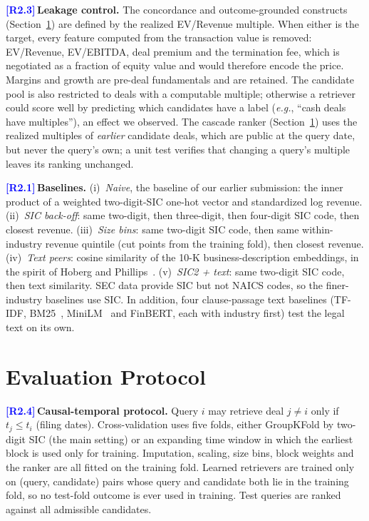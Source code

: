 \documentclass[conference]{IEEEtran}
\newcommand{\eg}{\textit{e.g.}}
\newcommand{\rc}[1]{\textcolor{blue}{\textbf{[#1]}}\,}
\newcommand{\rc}[1]{}
\begin{document}
\rc{R2.3}\noindent\textbf{Leakage control.}
The concordance and outcome-grounded constructs (Section~\ref{sec:eval}) are defined by the realized EV/Revenue multiple. When either is the target, every feature computed from the transaction value is removed: EV/Revenue, EV/EBITDA, deal premium and the termination fee, which is negotiated as a fraction of equity value and would therefore encode the price. Margins and growth are pre-deal fundamentals and are retained. The candidate pool is also restricted to deals with a computable multiple; otherwise a retriever could score well by predicting which candidates have a label (\eg, ``cash deals have multiples''), an effect we observed. The cascade ranker (Section~\ref{sec:eval}) uses the realized multiples of \emph{earlier} candidate deals, which are public at the query date, but never the query's own; a unit test verifies that changing a query's multiple leaves its ranking unchanged.

\rc{R2.1}\noindent\textbf{Baselines.}
(i)~\emph{Naive}, the baseline of our earlier submission: the inner product of a weighted two-digit-SIC one-hot vector and standardized log revenue. (ii)~\emph{SIC back-off}: same two-digit, then three-digit, then four-digit SIC code, then closest revenue. (iii)~\emph{Size bins}: same two-digit SIC code, then same within-industry revenue quintile (cut points from the training fold), then closest revenue. (iv)~\emph{Text peers}: cosine similarity of the 10-K business-description embeddings, in the spirit of Hoberg and Phillips~\cite{hoberg2016}. (v)~\emph{SIC2 + text}: same two-digit SIC code, then text similarity. SEC data provide SIC but not NAICS codes, so the finer-industry baselines use SIC. In addition, four clause-passage text baselines (TF-IDF, BM25~\cite{robertson2009}, MiniLM~\cite{reimers2019} and FinBERT, each with industry first) test the legal text on its own.

\section{Evaluation Protocol}
\label{sec:eval}

\rc{R2.4}\noindent\textbf{Causal-temporal protocol.}
Query $i$ may retrieve deal $j\neq i$ only if $t_j\le t_i$ (filing dates). Cross-validation uses five folds, either GroupKFold by two-digit SIC (the main setting) or an expanding time window in which the earliest block is used only for training. Imputation, scaling, size bins, block weights and the ranker are all fitted on the training fold. Learned retrievers are trained only on (query, candidate) pairs whose query and candidate both lie in the training fold, so no test-fold outcome is ever used in training. Test queries are ranked against all admissible candidates.
\end{document}
